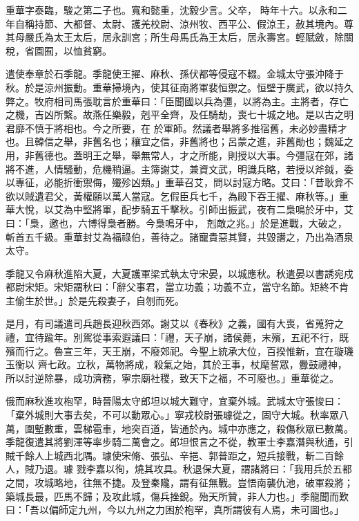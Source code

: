 \begin{pinyinscope}
 重華字泰臨，駿之第二子也。寬和懿重，沈毅少言。父卒，
 時年十六。以永和二年自稱持節、大都督、太尉、護羌校尉、涼州牧、西平公、假涼王，赦其境內。尊其母嚴氏為太王太后，居永訓宮；所生母馬氏為王太后，居永壽宮。輕賦斂，除關稅，省園囿，以恤貧窮。



 遣使奉章於石季龍。季龍使王擢、麻秋、孫伏都等侵寇不輟。金城太守張沖降于秋。於是涼州振動。重華掃境內，使其征南將軍裴恒禦之。恒壁于廣武，欲以持久弊之。牧府相司馬張耽言於重華曰：「臣聞國以兵為彊，以將為主。主將者，存亡之機，吉凶所繫。故燕任樂毅，剋平全齊，及任騎劫，喪七十城之地。是以古之明君靡不慎于將相也。今之所要，在
 於軍師。然議者舉將多推宿舊，未必妙盡精才也。且韓信之舉，非舊名也；穰宜之信，非舊將也；呂蒙之進，非舊勛也；魏延之用，非舊德也。蓋明王之舉，舉無常人，才之所能，則授以大事。今彊寇在郊，諸將不進，人情騷動，危機稍逼。主簿謝艾，兼資文武，明識兵略，若授以斧鉞，委以專征，必能折衝禦侮，殲殄凶類。」重華召艾，問以討寇方略。艾曰：「昔耿弇不欲以賊遺君父，黃權願以萬人當寇。乞假臣兵七千，為殿下吞王擢、麻秋等。」重華大悅，以艾為中堅將軍，配步騎五千擊秋。引師出振武，夜有二梟鳴於牙中，艾曰：「梟，邀也，六博得梟者勝。今梟鳴牙中，
 剋敵之兆。」於是進戰，大破之，斬首五千級。重華封艾為福祿伯，善待之。諸寵貴惡其賢，共毀譖之，乃出為酒泉太守。



 季龍又令麻秋進陷大夏，大夏護軍梁式執太守宋晏，以城應秋。秋遣晏以書誘宛戍都尉宋矩。宋矩謂秋曰：「辭父事君，當立功義；功義不立，當守名節。矩終不肯主偷生於世。」於是先殺妻子，自刎而死。



 是月，有司議遣司兵趙長迎秋西郊。謝艾以《春秋》之義，國有大喪，省蒐狩之禮，宜待踰年。別駕從事索遐議曰：「禮，天子崩，諸侯薨，末殯，五祀不行，既殯而行之。魯宣三年，天王崩，不廢郊祀。今聖上統承大位，百揆惟新，宜在璇璣玉衡以
 齊七政。立秋，萬物將成，殺氣之始，其於王事，杖麾誓眾，釁鼓禮神，所以討逆除暴，成功濟務，寧宗廟社稷，致天下之福，不可廢也。」重華從之。



 俄而麻秋進攻枹罕，時晉陽太守郎坦以城大難守，宜棄外城。武城太守張悛曰：「棄外城則大事去矣，不可以動眾心。」寧戎校尉張璩從之，固守大城。秋率眾八萬，圍塹數重，雲梯雹車，地突百道，皆通於內。城中亦應之，殺傷秋眾已數萬。季龍復遣其將劉渾等率步騎二萬會之。郎坦恨言之不從，教軍士李嘉潛與秋通，引賊千餘人上城西北隅。璩使宋脩、張弘、辛挹、郭普距之，短兵接戰，斬二百餘人，賊乃退。璩
 戮李嘉以徇，燒其攻具。秋退保大夏，謂諸將曰：「我用兵於五都之間，攻城略地，往無不捷。及登秦隴，謂有征無戰。豈悟南襲仇池，破軍殺將；築城長最，匹馬不歸；及攻此城，傷兵挫銳。殆天所贊，非人力也。」季龍聞而歎曰：「吾以偏師定九州，今以九州之力困於枹罕，真所謂彼有人焉，未可圖也。」




\end{pinyinscope}
